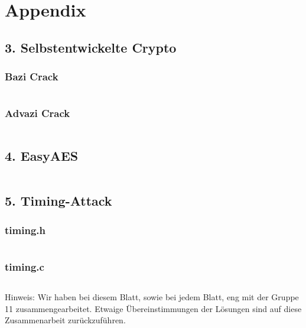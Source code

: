 \documentclass[10pt,a4paper]{article}
\begin{document}
\newpage
\section*{Appendix}
\subsection{3. Selbstentwickelte Crypto}
\subsubsection*{Bazi Crack}
\inputminted{python}{crack_bazi.py}

\newpage

\subsubsection*{Advazi Crack}
\inputminted{python}{crack_advazi.py}

\newpage

\subsection{4. EasyAES}
\inputminted{C}{EasyAES/mitm.c}

\subsection{5. Timing-Attack}
\subsubsection*{timing.h}
\inputminted{C}{timingAngriff/timing.h}

\subsubsection*{timing.c}
\inputminted{C}{timingAngriff/timing.c}


Hinweis: Wir haben bei diesem Blatt, sowie bei jedem Blatt, eng mit der Gruppe 11 zusammengearbeitet. Etwaige Übereinstimmungen der Lösungen sind auf diese Zusammenarbeit zurückzuführen.
\end{document}
